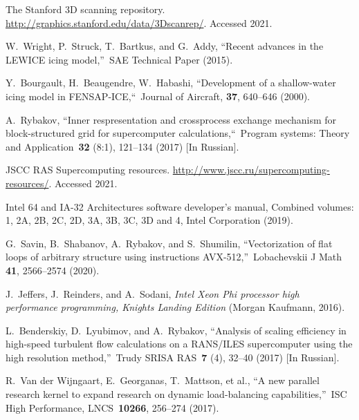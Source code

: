 \documentclass[
11pt,%
tightenlines,%
twoside,%
onecolumn,%
nofloats,%
nobibnotes,%
nofootinbib,%
superscriptaddress,%
noshowpacs,%
centertags]%
{revtex4}
\begin{document}
\begin{thebibliography}{99}
The Stanford 3D scanning repository. \url{http://graphics.stanford.edu/data/3Dscanrep/}. Accessed 2021.

W.~Wright, P.~Struck, T.~Bartkus, and G.~Addy, \textquotedblleft Recent advances in the LEWICE icing model,\textquotedblright \ SAE Technical Paper (2015).

Y.~Bourgault, H.~Beaugendre, W.~Habashi, \textquotedblleft Development of a shallow-water icing model in FENSAP-ICE,\textquotedblleft \ Journal of Aircraft, \textbf{37}, 640--646 (2000).


A.~Rybakov, \textquotedblleft Inner respresentation and crossprocess exchange mechanism for block-structured grid for supercomputer calculations,\textquotedblleft \  Program systems: Theory and Application~{\bf 32} (8:1), 121--134 (2017) [In Russian].


JSCC RAS Supercomputing resources. \url{http://www.jscc.ru/supercomputing-resources/}. Accessed 2021.

Intel 64 and IA-32 Architectures software developer's manual, Combined volumes: 1, 2A, 2B, 2C, 2D, 3A, 3B, 3C, 3D and 4, Intel Corporation (2019).

G.~Savin, B.~Shabanov, A.~Rybakov, and S.~Shumilin, \textquotedblleft Vectorization of flat loops of arbitrary structure using instructions AVX-512,\textquotedblright \ Lobachevskii J Math {\bf 41}, 2566--2574 (2020).

J.~Jeffers, J.~Reinders, and A.~Sodani, \emph{Intel Xeon Phi processor high performance programming, Knights Landing Edition} (Morgan Kaufmann, 2016).

L.~Benderskiy, D.~Lyubimov, and A.~Rybakov, \textquotedblleft Analysis of scaling efficiency in high-speed turbulent flow calculations on a RANS/ILES supercomputer using the high resolution method,\textquotedblright \ Trudy SRISA RAS~{\bf 7} (4), 32--40 (2017) [In Russian].

R.~Van der Wijngaart, E.~Georganas, T.~Mattson, et al., \textquotedblleft A new parallel research kernel to expand research on dynamic load-balancing capabilities,\textquotedblright \ ISC High Performance, LNCS~{\bf 10266}, 256--274 (2017).


\end{thebibliography}
\end{document}
